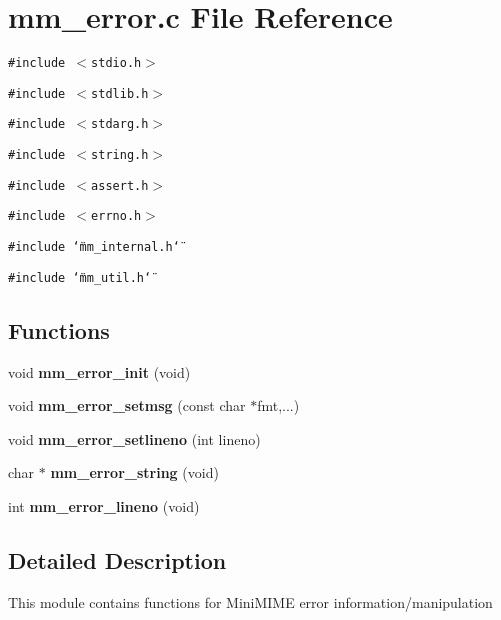 \section{mm\_\-error.c File Reference}
\label{mm__error_8c}
{\tt \#include $<$stdio.h$>$}\par
{\tt \#include $<$stdlib.h$>$}\par
{\tt \#include $<$stdarg.h$>$}\par
{\tt \#include $<$string.h$>$}\par
{\tt \#include $<$assert.h$>$}\par
{\tt \#include $<$errno.h$>$}\par
{\tt \#include \char`\"{}mm\_\-internal.h\char`\"{}}\par
{\tt \#include \char`\"{}mm\_\-util.h\char`\"{}}\par
\subsection*{Functions}
\begin{CompactItemize}
\item 
void {\bf mm\_\-error\_\-init} (void)
\item 
void {\bf mm\_\-error\_\-setmsg} (const char $\ast$fmt,...)
\item 
void \textbf{mm\_\-error\_\-setlineno} (int lineno)\label{mm__error_8c_190c991d7bb378b6cd6f995ffc3011f7}

\item 
char $\ast$ {\bf mm\_\-error\_\-string} (void)
\item 
int \textbf{mm\_\-error\_\-lineno} (void)\label{mm__error_8c_c84acacac29f1e6efd10bb3a89eab272}

\end{CompactItemize}


\subsection{Detailed Description}
This module contains functions for Mini\-MIME error information/manipulation 